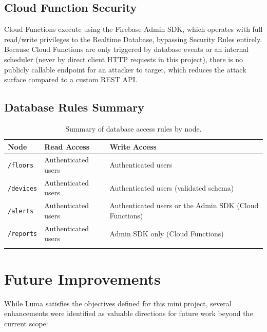 \documentclass[11pt,a4paper]{article}
\begin{document}
\subsection{Cloud Function Security}
Cloud Functions execute using the Firebase Admin SDK, which operates with full read/write privileges to the Realtime Database, bypassing Security Rules entirely. Because Cloud Functions are only triggered by database events or an internal scheduler (never by direct client HTTP requests in this project), there is no publicly callable endpoint for an attacker to target, which reduces the attack surface compared to a custom REST API.

\subsection{Database Rules Summary}
\begin{longtable}{@{}p{2.6cm}p{4.8cm}p{5.4cm}@{}}
\toprule
\textbf{Node} & \textbf{Read Access} & \textbf{Write Access} \\
\midrule
\endhead
\texttt{/floors} & Authenticated users & Authenticated users \\
\texttt{/devices} & Authenticated users & Authenticated users (validated schema) \\
\texttt{/alerts} & Authenticated users & Authenticated users or the Admin SDK (Cloud Functions) \\
\texttt{/reports} & Authenticated users & Admin SDK only (Cloud Functions) \\
\bottomrule
\caption{Summary of database access rules by node.}
\label{tab:security-summary}
\end{longtable}

\section{Future Improvements}
\label{sec:future}

While Luma satisfies the objectives defined for this mini project, several enhancements were identified as valuable directions for future work beyond the current scope:
\end{document}
